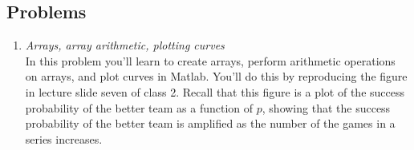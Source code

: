 \documentclass[12pt]{article}
\begin{document}
\subsection*{Problems}
\begin{enumerate}
\item \textit{Arrays, array arithmetic, plotting curves}\\
In this problem you'll learn to create arrays, perform arithmetic operations on arrays, and plot curves in Matlab.  You'll do this by reproducing the figure in  lecture slide seven of class 2.  Recall that this figure is a plot of the success probability of the better team as a function of $p$,  showing that the success probability of the better team is amplified as the number of the games in a series increases.  \\


\end{enumerate}
\end{document}
